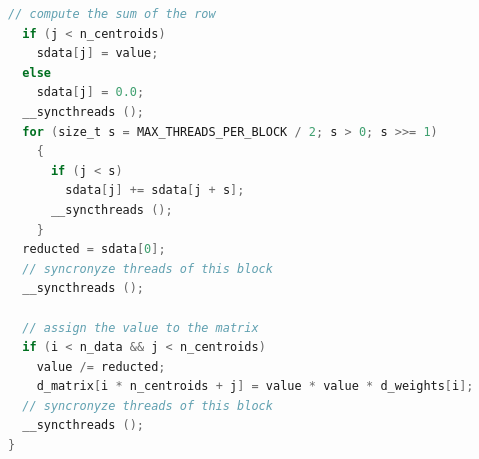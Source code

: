 \begin{lstlisting}[style=code, language=C, rulecolor=\color{blue}]
  // compute the sum of the row
  if (j < n_centroids)
    sdata[j] = value;
  else
    sdata[j] = 0.0;
  __syncthreads ();
  for (size_t s = MAX_THREADS_PER_BLOCK / 2; s > 0; s >>= 1)
    {
      if (j < s)
        sdata[j] += sdata[j + s];
      __syncthreads ();
    }
  reducted = sdata[0];
  // syncronyze threads of this block
  __syncthreads ();

  // assign the value to the matrix
  if (i < n_data && j < n_centroids)
    value /= reducted;
    d_matrix[i * n_centroids + j] = value * value * d_weights[i];
  // syncronyze threads of this block
  __syncthreads ();
}\end{lstlisting}
